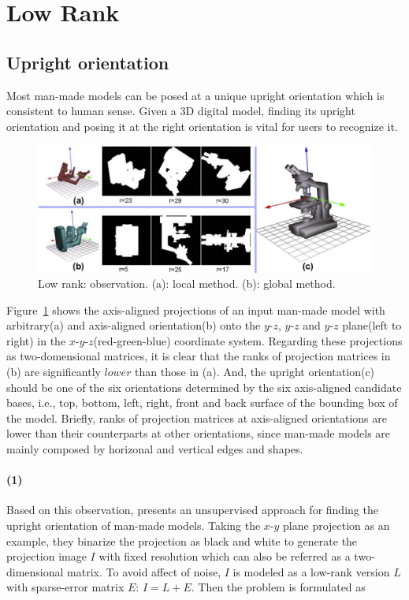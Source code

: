 \section{Low Rank}
\label{sec:LowRank}


\subsection{Upright orientation}
\label{subsec:upright orientation}

Most man-made models can be posed at a unique upright orientation which is consistent to human sense. Given a 3D digital model, finding its upright orientation and posing it at the right orientation is vital for users to recognize it.

\begin{figure}[ht]
  \centering
  \includegraphics[width=5in]{images/lowrank}
  \caption{Low rank: observation. (a): local method\cite{jin2012unsupervised}. (b): global method\cite{wang2014upright}.}
  \label{fig:lowrank}
\end{figure}

Figure~\ref{fig:lowrank} shows the axis-aligned projections of an input man-made model with arbitrary(a) and axis-aligned orientation(b) onto the $y$-$z$, $y$-$z$ and $y$-$z$ plane(left to right) in the $x$-$y$-$z$(red-green-blue) coordinate system.
Regarding these projections as two-domensional matrices,
it is clear that the ranks of projection matrices in (b) are significantly $lower$ than those in (a).
And, the upright orientation(c) should be one of the six orientations determined by the six axis-aligned candidate bases, i.e., top, bottom, left, right, front and back surface of the bounding box of the model.
Briefly, ranks of projection matrices at axis-aligned orientations are lower than their counterparts at other orientations, since man-made models are mainly composed by horizonal and vertical edges and shapes.

\paragraph{(1)}
Based on this observation, \cite{jin2012unsupervised} presents an unsupervised approach for finding the upright orientation of man-made models.
Taking the $x$-$y$ plane projection as an example, they binarize the projection as black and white to generate the projection image $I$ with fixed resolution which can also be referred as a two-dimensional matrix.
To avoid affect of noise, $I$ is modeled as a low-rank version $L$ with sparse-error matrix $E$: $I=L+E$.
Then the problem is formulated as

